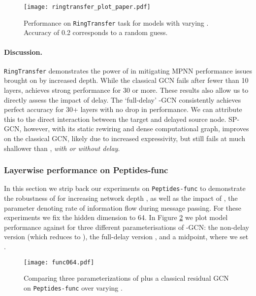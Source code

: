 \documentclass{article}
\theoremstyle{plain}
\theoremstyle{definition}
\theoremstyle{remark}
\begin{document}
 \begin{figure}[ht]
\begin{center}
\centerline{\texttt{[image: ringtransfer\_plot\_paper.pdf]}}
\caption{Performance on \texttt{RingTransfer} task for models with varying . Accuracy of 0.2 corresponds to a random guess.}
\label{Fig:ringtransfer}
\end{center}
\vspace{-0.3in}
\end{figure}

\vspace{-2mm}

\paragraph{Discussion.} \texttt{RingTransfer} demonstrates the power of  in mitigating MPNN performance issues brought on by increased depth. While the classical GCN fails after fewer than 10 layers,  achieves strong performance for 30 or more. These results also allow us to directly assess the impact of delay. The `full-delay' -GCN consistently achieves perfect accuracy for 30+ layers with no drop in performance. We can attribute this to the direct interaction between the target and delayed source node.
SP-GCN, however, with its static rewiring and dense computational graph, improves on the classical GCN, likely due to increased expressivity, but still fails at much shallower  than , \emph{with or without delay}.


\subsubsection{Layerwise performance on Peptides-func}

 In this section we strip back our experiments on \texttt{Peptides-func} to demonstrate the robustness of   for increasing network depth , as well as the impact of , the parameter denoting rate of information flow during message passing. For these experiments we fix the hidden dimension to 64.
 In Figure \ref{Fig:pept-func_d=64} we plot model performance against  for three different parameterisations of -GCN: the non-delay version  (which reduces to ), the full-delay version , and a midpoint, where we set .

 \begin{figure}[ht]
\begin{center}
\centerline{\texttt{[image: func064.pdf]}}
\vspace{-0.13in} \caption{Comparing three parameterizations of  plus a classical residual GCN on \texttt{Peptides-func} over varying .}
\label{Fig:pept-func_d=64}
\end{center}
\vspace{-0.3in}
\end{figure}
\end{document}
